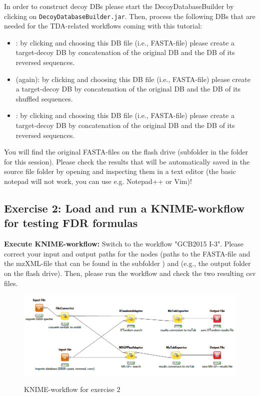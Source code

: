 \begin{task}
In order to construct decoy DBs please start the DecoyDatabaseBuilder by clicking on \texttt{DecoyDatabaseBuilder.jar}. Then, process the following DBs that are needed for the TDA-related workflows coming with this tutorial:
\begin{itemize}
	\item {}: by clicking  and choosing this DB file (i.e., FASTA-file) please create a target-decoy DB by concatenation of the original DB and the DB of its reversed sequences.
	\item {} (again): by clicking  and choosing this DB file (i.e., FASTA-file) please create a target-decoy DB by concatenation of the original DB and the DB of its shuffled sequences.
	\item {}: by clicking  and choosing this DB file (i.e., FASTA-file) please create a target-decoy DB by concatenation of the original DB and the DB of its reversed sequences.
\end{itemize}
You will find the original FASTA-files on the flash drive (subfolder \newline{} in the folder for this session). Please check the results that will be automatically saved in the source file folder by opening and inspecting them in a text editor (the basic notepad will not work, you can use e.g. Notepad++ or Vim)!
\end{task}



\subsection{Exercise 2: Load and run a KNIME-workflow for testing FDR formulas}
\textbf{Execute KNIME-workflow:} Switch to the workflow "GCB2015 I-3". Please correct your input and output paths for the nodes  (paths to the FASTA-file and the mzXML-file that can be found in the subfolder ) and  (e.g., the output folder  on the flash drive). Then, please run the workflow and check the two resulting csv files.

\begin{figure}
	\centering
		\includegraphics[scale=0.7]{graphics/targetdecoy/workflow_tda_i3.png}
	\label{fig:workflow_tda_i3}
	\caption{KNIME-workflow for exercise 2}
\end{figure}

